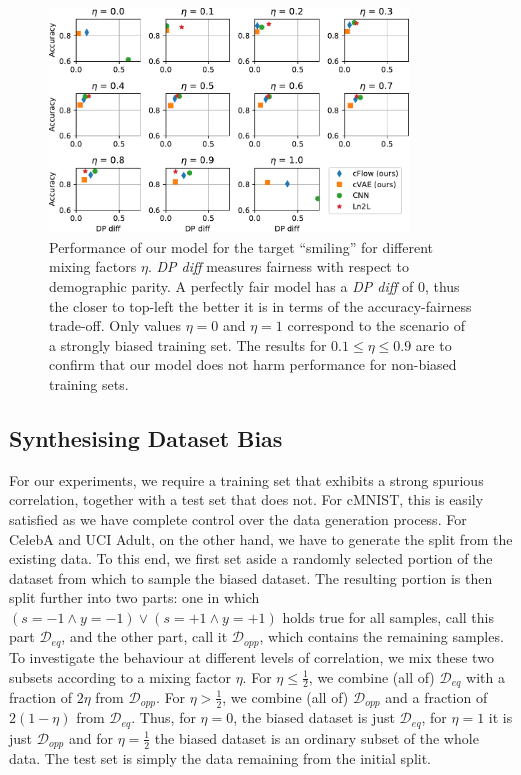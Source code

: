 \begin{figure}[tb]
    \centering
    \includegraphics[width=0.85\textwidth]{nifr/Figures/nosinn_celeba_multiplot_all_landscape_Smiling.pdf}
    \caption{
        Performance of our model for the target ``smiling'' for different mixing factors $\eta$.
        \emph{DP diff} measures fairness with respect to demographic parity.
        A perfectly fair model has a \emph{DP diff} of 0, thus the closer to top-left the better it
        is in terms of the accuracy-fairness trade-off.
        Only values $\eta=0$ and $\eta=1$ correspond to the scenario of a strongly biased training
        set.
        The results for $0.1\leq \eta\leq 0.9$ are to confirm that our model does not harm
        performance for non-biased training sets.
    }%
    \label{fig:celeba-multiplot}
\end{figure}
%
\subsection{Synthesising Dataset Bias}
%
For our experiments, we require a training set that exhibits a strong spurious correlation,
together with a test set that does not.
%
For cMNIST, this is easily satisfied as we have complete control over the data generation process.
%
For CelebA and  UCI Adult, on the other hand, we have to generate the split from the existing data.
%
To this end, we first set aside a randomly selected portion of the dataset from which to sample the
biased dataset.
%
The resulting portion is then split further into two parts: one in which \( (s=-1 \land y=-1) \lor
(s=+1 \land y=+1) \) holds true for all samples, call this part \( \mathcal{D}_{eq} \), and the
other part, call it \( \mathcal{D}_{opp} \), which contains the remaining samples.
%
To investigate the behaviour at different levels of correlation, we mix these two subsets according
to a mixing factor \( \eta \).
%
For $\eta \leq \tfrac{1}{2}$, we combine (all of) $\mathcal{D}_{eq}$ with a fraction of $2\eta$
from $\mathcal{D}_{opp}$.
%
For $\eta > \tfrac{1}{2}$, we combine (all of) $\mathcal{D}_{opp}$ and a fraction of $2(1 -\eta)$
from $\mathcal{D}_{eq}$.
%
Thus, for $\eta=0$, the biased dataset is just $\mathcal{D}_{eq}$, for $\eta=1$ it is just
$\mathcal{D}_{opp}$ and for $\eta=\tfrac{1}{2}$ the biased dataset is an ordinary subset of the
whole data. The test set is simply the data remaining from the initial split.
%
